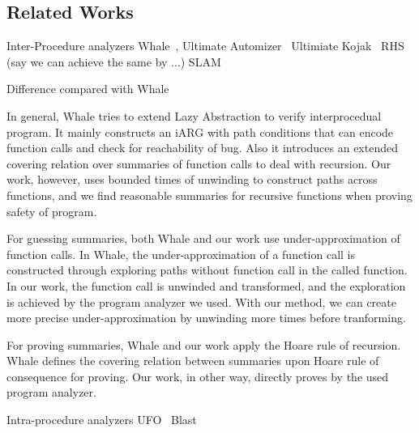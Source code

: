 \subsection*{Related Works}
Inter-Procedure analyzers
Whale~\cite{AlbarghouthiGC12},
Ultimate Automizer~\cite{HeizmannCDEHLNSP13}
Ultimiate Kojak~\cite{Kojak}
RHS~\cite{RepsHS95} (say we can achieve the same by ...)
SLAM~\cite{BallR01}

Difference compared with Whale

In general, Whale tries to extend Lazy Abstraction to verify interprocedual program.
It mainly constructs an iARG with path conditions that can encode function calls and check for reachability of bug.
Also it introduces an extended covering relation over summaries of function calls to deal with recursion.
Our work, however, uses bounded times of unwinding to construct paths across functions,
and we find reasonable summaries for recursive functions when proving safety of program.

For guessing summaries, both Whale and our work use under-approximation of function calls.
In Whale, the under-approximation of a function call is constructed through exploring paths without function call in the called function.
In our work, the function call is unwinded and transformed, and the exploration is achieved by the program analyzer we used.
With our method, we can create more precise under-approximation by unwinding more times before tranforming.

For proving summaries, Whale and our work apply the Hoare rule of recursion. Whale defines the covering relation between summaries upon Hoare rule of consequence for proving. Our work, in other way, directly proves by the used program analyzer.

Intra-procedure analyzers
UFO~\cite{AlbarghouthiLGC12}
Blast~\cite{BeyerHJM07}



